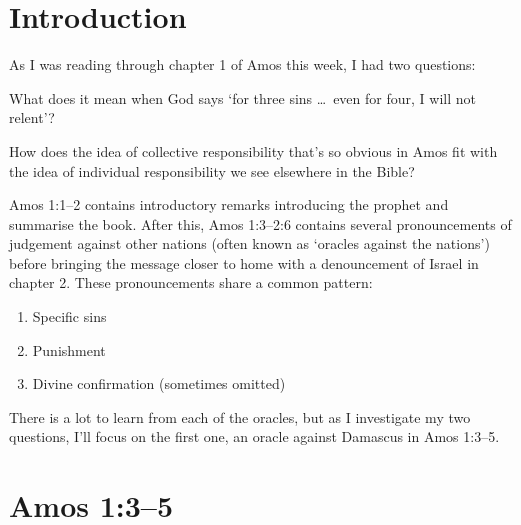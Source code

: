 \newcommand{\Date}{February 25, 2019}
\newcommand{\Title}{Bible Notes: Amos 1}



\section{Introduction}

As I was reading through chapter 1 of Amos this week, I had two questions:
\begin{inparaenum}[(1)]
    \item What does it mean when God says `for three sins \dots\ even for four, I
    will not relent'?
    \item How does the idea of collective responsibility that's so obvious in Amos
    fit with the idea of individual responsibility we see elsewhere in the
    Bible?
\end{inparaenum}

Amos 1:1--2 contains introductory remarks introducing the prophet and summarise
the book. After this, Amos 1:3--2:6 contains several pronouncements of judgement
against other nations (often known as `oracles against the nations') before
bringing the message closer to home with a denouncement of Israel in chapter 2.
These pronouncements share a common pattern:

\begin{enumerate}
    \item Specific sins
    \item Punishment
    \item Divine confirmation (sometimes omitted)
    \autocite[65]{smith:2017}
\end{enumerate}

There is a lot to learn from each of the oracles, but as I investigate my two
questions, I'll focus on the first one, an oracle against Damascus in Amos
1:3--5.


\section{Amos 1:3--5}


